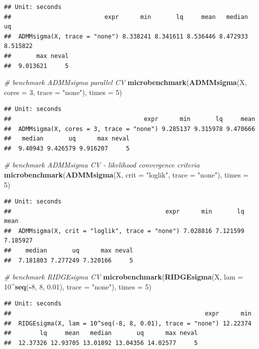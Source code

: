 \documentclass[11pt,]{book}
\newenvironment{Shaded}{\begin{snugshade}}{\end{snugshade}}
\newcommand{\CommentTok}[1]{\textcolor[rgb]{0.56,0.35,0.01}{\textit{#1}}}
\newcommand{\DataTypeTok}[1]{\textcolor[rgb]{0.13,0.29,0.53}{#1}}
\newcommand{\DecValTok}[1]{\textcolor[rgb]{0.00,0.00,0.81}{#1}}
\newcommand{\FloatTok}[1]{\textcolor[rgb]{0.00,0.00,0.81}{#1}}
\newcommand{\KeywordTok}[1]{\textcolor[rgb]{0.13,0.29,0.53}{\textbf{#1}}}
\newcommand{\NormalTok}[1]{#1}
\newcommand{\OperatorTok}[1]{\textcolor[rgb]{0.81,0.36,0.00}{\textbf{#1}}}
\newcommand{\StringTok}[1]{\textcolor[rgb]{0.31,0.60,0.02}{#1}}
\theoremstyle{definition}
\theoremstyle{definition}
\theoremstyle{definition}
\theoremstyle{remark}
\begin{document}
\begin{verbatim}
## Unit: seconds
##                          expr      min       lq     mean   median       uq
##  ADMMsigma(X, trace = "none") 8.338241 8.341611 8.536446 8.472933 8.515822
##       max neval
##  9.013621     5
\end{verbatim}

\begin{Shaded}
\begin{Highlighting}[]
\CommentTok{# benchmark ADMMsigma parallel CV}
\KeywordTok{microbenchmark}\NormalTok{(}\KeywordTok{ADMMsigma}\NormalTok{(X, }\DataTypeTok{cores =} \DecValTok{3}\NormalTok{, }\DataTypeTok{trace =} \StringTok{"none"}\NormalTok{), }\DataTypeTok{times =} \DecValTok{5}\NormalTok{)}
\end{Highlighting}
\end{Shaded}

\begin{verbatim}
## Unit: seconds
##                                     expr      min       lq     mean
##  ADMMsigma(X, cores = 3, trace = "none") 9.285137 9.315978 9.470666
##   median       uq      max neval
##  9.40943 9.426579 9.916207     5
\end{verbatim}

\begin{Shaded}
\begin{Highlighting}[]
\CommentTok{# benchmark ADMMsigma CV - likelihood convergence criteria}
\KeywordTok{microbenchmark}\NormalTok{(}\KeywordTok{ADMMsigma}\NormalTok{(X, }\DataTypeTok{crit =} \StringTok{"loglik"}\NormalTok{, }\DataTypeTok{trace =} \StringTok{"none"}\NormalTok{), }\DataTypeTok{times =} \DecValTok{5}\NormalTok{)}
\end{Highlighting}
\end{Shaded}

\begin{verbatim}
## Unit: seconds
##                                           expr      min       lq     mean
##  ADMMsigma(X, crit = "loglik", trace = "none") 7.028816 7.121599 7.185927
##    median       uq      max neval
##  7.181803 7.277249 7.320166     5
\end{verbatim}

\begin{Shaded}
\begin{Highlighting}[]
\CommentTok{# benchmark RIDGEsigma CV}
\KeywordTok{microbenchmark}\NormalTok{(}\KeywordTok{RIDGEsigma}\NormalTok{(X, }\DataTypeTok{lam =} \DecValTok{10}\OperatorTok{^}\KeywordTok{seq}\NormalTok{(}\OperatorTok{-}\DecValTok{8}\NormalTok{, }\DecValTok{8}\NormalTok{, }\FloatTok{0.01}\NormalTok{), }\DataTypeTok{trace =} \StringTok{"none"}\NormalTok{), }\DataTypeTok{times =} \DecValTok{5}\NormalTok{)}
\end{Highlighting}
\end{Shaded}

\begin{verbatim}
## Unit: seconds
##                                                      expr      min
##  RIDGEsigma(X, lam = 10^seq(-8, 8, 0.01), trace = "none") 12.22374
##        lq     mean   median       uq      max neval
##  12.37326 12.93705 13.01892 13.04356 14.02577     5
\end{verbatim}


\end{document}

